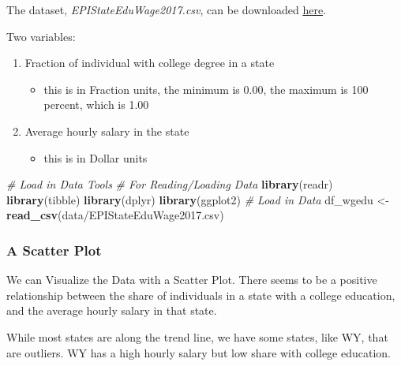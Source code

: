 \documentclass[
]{book}
\newenvironment{Shaded}{\begin{snugshade}}{\end{snugshade}}
\newcommand{\CommentTok}[1]{\textcolor[rgb]{0.56,0.35,0.01}{\textit{#1}}}
\newcommand{\KeywordTok}[1]{\textcolor[rgb]{0.13,0.29,0.53}{\textbf{#1}}}
\newcommand{\NormalTok}[1]{#1}
\newcommand{\StringTok}[1]{\textcolor[rgb]{0.31,0.60,0.02}{#1}}
\providecommand{\tightlist}{%
  \setlength{\itemsep}{0pt}\setlength{\parskip}{0pt}}
\begin{document}
The dataset, \emph{EPIStateEduWage2017.csv}, can be downloaded \href{https://github.com/FanWangEcon/Stat4Econ/tree/master/data/EPIStateEduWage2017.csv}{here}.

Two variables:

\begin{enumerate}
\def\labelenumi{\arabic{enumi}.}
\tightlist
\item
  Fraction of individual with college degree in a state

  \begin{itemize}
  \tightlist
  \item
    this is in Fraction units, the minimum is 0.00, the maximum is 100 percent, which is 1.00
  \end{itemize}
\item
  Average hourly salary in the state

  \begin{itemize}
  \tightlist
  \item
    this is in Dollar units
  \end{itemize}
\end{enumerate}

\begin{Shaded}
\begin{Highlighting}[]
\CommentTok{\# Load in Data Tools}
\CommentTok{\# For Reading/Loading Data}
\KeywordTok{library}\NormalTok{(readr)}
\KeywordTok{library}\NormalTok{(tibble)}
\KeywordTok{library}\NormalTok{(dplyr)}
\KeywordTok{library}\NormalTok{(ggplot2)}
\CommentTok{\# Load in Data}
\NormalTok{df\_wgedu \textless{}{-}}\StringTok{ }\KeywordTok{read\_csv}\NormalTok{(}\StringTok{\textquotesingle{}data/EPIStateEduWage2017.csv\textquotesingle{}}\NormalTok{)}
\end{Highlighting}
\end{Shaded}

\hypertarget{a-scatter-plot}{%
\subsubsection{A Scatter Plot}\label{a-scatter-plot}}

We can Visualize the Data with a Scatter Plot. There seems to be a positive relationship between the share of individuals in a state with a college education, and the average hourly salary in that state.

While most states are along the trend line, we have some states, like WY, that are outliers. WY has a high hourly salary but low share with college education.
\end{document}
